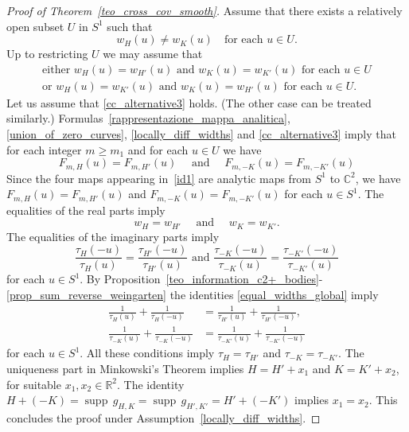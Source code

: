 \documentclass[a4paper]{amsart}
\theoremstyle{definition}
\numberwithin{equation}{section}
\begin{document}
\begin{proof}[Proof of Theorem~\ref{teo_cross_cov_smooth}]
Assume that there exists a relatively open subset $U$ in ${S^{1}}$ such that
\begin{equation}\label{locally_diff_widths}
 {{{w}}}_H(u)\neq{{{w}}}_K(u)\quad\text{for each $u\in U$.}
\end{equation}
Up to restricting $U$ we may assume that
\begin{align}
\text{either ${{{w}}}_H(u)={{{w}}}_{H'}(u)$ and ${{{w}}}_K(u)={{{w}}}_{K'}(u)$ for each $u\in U$}\label{cc_alternative3}\\
 \text{or ${{{w}}}_H(u)={{{w}}}_{K'}(u)$ and ${{{w}}}_K(u)={{{w}}}_{H'}(u)$ for each $u\in U$}\label{cc_alternative4}.
\end{align}
Let us assume that \eqref{cc_alternative3} holds. (The other case can be treated similarly.)
Formulas~\eqref{rappresentazione_mappa_analitica}, \eqref{union_of_zero_curves}, \eqref{locally_diff_widths} and \eqref{cc_alternative3} imply that for each integer $m\geq m_1$ and for each $u\in U$ we have
\begin{equation}\label{id1}
 F_{m,H}(u)=F_{m,H'}(u)\quad\text{ and }\quad F_{m,-K}(u)=F_{m,-K'}(u)
\end{equation}
Since the four maps appearing in~\eqref{id1} are analytic maps from ${S^{1}}$ to ${\mathbb{C}}^2$, we have $F_{m,H}(u)=F_{m,H'}(u)$ and $F_{m,-K}(u)=F_{m,-K'}(u)$ for each $u\in{S^{1}}$. The equalities of the real parts imply
\begin{equation}\label{equal_widths_global}
 {{{w}}}_H={{{w}}}_{H'}\quad\text{ and }\quad{{{w}}}_K={{{w}}}_{K'}.
\end{equation}
The equalities of the imaginary parts imply
\begin{equation}\label{equal_ratio_curv_2}
\frac{{\tau}_{H}(-u)}{{\tau}_{H}(u)}=\frac{{\tau}_{H'}(-u)}{{\tau}_{H'}(u)}\text{ and }
\frac{{\tau}_{-K}(-u)}{{\tau}_{-K}(u)}=\frac{{\tau}_{-K'}(-u)}{{\tau}_{-K'}(u)}
\end{equation}
for each $u\in{S^{1}}$. 
By Proposition~\ref{teo_information_c2+_bodies}-\eqref{prop_sum_reverse_weingarten} the identities \eqref{equal_widths_global} imply
\begin{equation*}
\begin{aligned}
\frac1{{\tau}_{H}(u)}+\frac1{{\tau}_{H}(-u)}&=\frac1{{\tau}_{H'}(u)}+\frac1{{\tau}_{H'}(-u)}, \\
\frac1{{\tau}_{-K}(u)}+\frac1{{\tau}_{-K}(-u)}&=\frac1{{\tau}_{-K'}(u)}+\frac1{{\tau}_{-K'}(-u)}
\end{aligned}
\end{equation*}
for each $u\in{S^{1}}$. All these conditions imply ${\tau}_H={\tau}_{H'}$ and ${\tau}_{-K}={\tau}_{-K'}$.
The uniqueness part in Minkowski's Theorem \cite[Th. 7.2.1]{Sc} implies   $H=H'+x_1$ and $K=K'+x_2$, for suitable $x_1,x_2\in{\mathbb{R}}^2$.
The identity $H+(-K)={{\operatorname{supp}}}\, g_{H,K}={{\operatorname{supp}}}\, g_{H',K'}=H'+(-K')$ implies $x_1=x_2$. This concludes the proof under Assumption~\eqref{locally_diff_widths}.


\end{proof}
\end{document}

